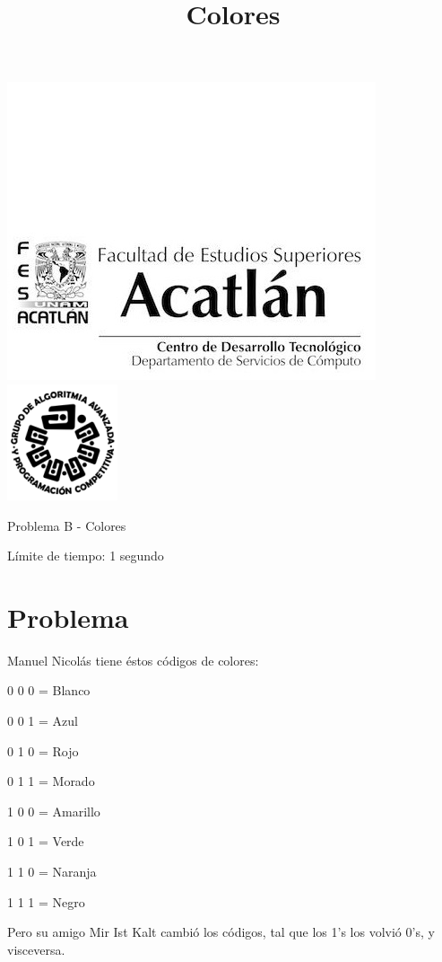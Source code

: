 \documentclass[letter,10pt]{article}
\date{}
\begin{document}
\title{Colores}

\includegraphics[scale=0.6]{logo} \hspace*{9.00cm}
\includegraphics[scale=0.5]{dsc} 
\bigskip
\begin{center}
    \Large Problema B - Colores
\end{center}

\begin{flushright}
Límite de tiempo: 1 segundo
\par\end{flushright}
\bigskip

\section*{Problema}
Manuel Nicolás tiene éstos códigos de colores:

0 0 0 = Blanco

0 0 1 = Azul

0 1 0 = Rojo

0 1 1 = Morado

1 0 0 = Amarillo

1 0 1 = Verde

1 1 0 = Naranja

1 1 1 = Negro

Pero su amigo Mir Ist Kalt cambió los códigos, tal que los 1's los volvió 0's, y visceversa.
\end{document}
